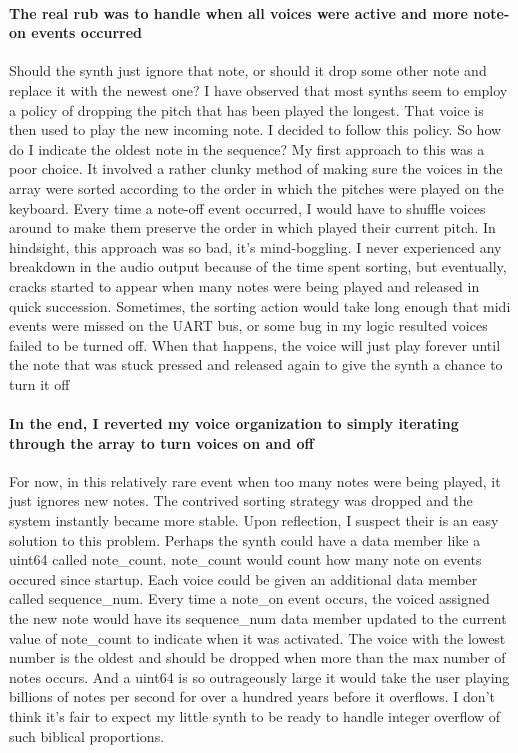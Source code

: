 \documentclass[acmlarge,screen]{acmart}
\begin{document}
	\paragraph{The real rub was to handle when all voices were active and more note-on events occurred} Should the synth just ignore that note, or should it drop some other note and replace it with the newest one? I have observed that most synths seem to employ a policy of dropping the pitch that has been played the longest. That voice is then used to play the new incoming note. I decided to follow this policy. So how do I indicate the oldest note in the sequence?  My first approach to this was a poor choice. It involved a rather clunky method of making sure the voices in the array were sorted according to the order in which the pitches were played on the keyboard. Every time a note-off event occurred, I would have to shuffle voices around to make them preserve the order in which played their current pitch. In hindsight, this approach was so bad, it's mind-boggling. I never experienced any breakdown in the audio output because of the time spent sorting, but eventually, cracks started to appear when many notes were being played and released in quick succession. Sometimes, the sorting action would take long enough that midi events were missed on the UART bus, or some bug in my logic resulted voices failed to be turned off. When that happens, the voice will just play forever until the note that was stuck pressed and released again to give the synth a chance to turn it off

	\paragraph{In the end, I reverted my voice organization to simply iterating through the array to turn voices on and off} For now, in this relatively rare event when too many notes were being played, it just ignores new notes. The contrived sorting strategy was dropped and the system instantly became more stable. Upon reflection, I suspect their is an easy solution to this problem. Perhaps the synth could have a data member like a uint64 called note\_count. note\_count would count how many note on events occured since startup. Each voice could be given an additional data member called sequence\_num. Every time a note\_on event occurs, the voiced assigned the new note would have its sequence\_num data member updated to the current value of note\_count to indicate when it was activated. The voice with the lowest number is the oldest and should be dropped when more than the max number of notes occurs. And a uint64 is so outrageously large it would take the user playing billions of notes per second for over a hundred years before it overflows. I don't think it's fair to expect my little synth to be ready to handle integer overflow of such biblical proportions.
\end{document}
